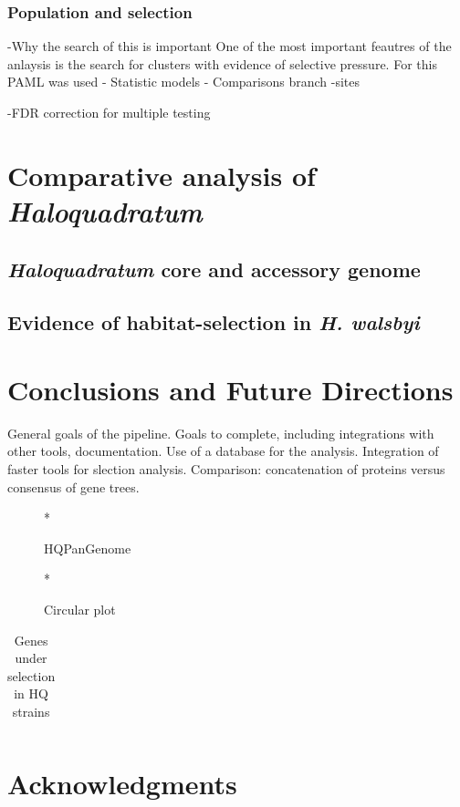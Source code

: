 \subsubsection{Population and selection}

-Why the search of this is important 
One of the most important feautres of the anlaysis is the search for clusters with evidence of selective pressure. For this PAML was used
- Statistic models
- Comparisons branch -sites

-FDR correction for multiple testing


\section{Comparative analysis of \textit{Haloquadratum}}

\subsection{\textit{Haloquadratum} core and accessory genome}

\subsection{Evidence of habitat-selection in \textit{H. walsbyi}}

\section{Conclusions and Future Directions}

General goals of the pipeline.
Goals to complete, including integrations with other tools, documentation. Use of a database for the analysis. Integration of faster tools for slection analysis.
Comparison: concatenation of proteins versus consensus of gene trees.


\begin{figure}[htbp]
	\centering
	*
	\caption{HQPanGenome}
	\label{HQPanGenome}
\end{figure}

\begin{figure}[htbp]
	\centering
	*
	\caption{Circular plot}
	\label{HQCircularPlot}
\end{figure}

\begin{table}[htdp]
\caption{Genes under selection in HQ strains}
\begin{center}
\begin{tabular}{|c|c|}

\end{tabular}
\end{center}
\label{SelectionHQ}
\end{table}%


\section{Acknowledgments}

%
%